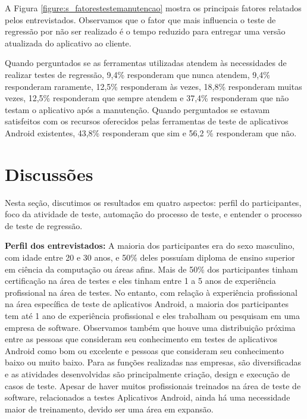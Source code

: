 \begin{enumerate}[label=\bf QP\arabic*]
A Figura \ref{figure:s_fatorestestemanutencao} mostra os principais fatores relatados pelos entrevistados. Observamos que o fator que mais influencia o teste de regressão por não ser realizado é o tempo reduzido para entregar uma versão atualizada do aplicativo ao cliente.

Quando perguntados se as ferramentas utilizadas atendem às necessidades de realizar testes de regressão, 9,4\% responderam que nunca atendem, 9,4\% responderam raramente, 12,5\% responderam às vezes, 18,8\% responderam muitas vezes, 12,5\% responderam que sempre atendem e 37,4\% responderam que não testam o aplicativo após a manutenção. Quando perguntados se estavam satisfeitos com os recursos oferecidos pelas ferramentas de teste de aplicativos Android existentes, 43,8\% responderam que sim e 56,2 \% responderam que não.

\end{enumerate}

\section{Discussões}\label{discussions}

Nesta seção, discutimos os resultados em quatro aspectos: perfil do participantes, foco da atividade de teste, automação do processo de teste, e entender o processo de teste de regressão.

\textbf{Perfil dos entrevistados:} A maioria dos participantes era do sexo masculino, com idade entre 20 e 30 anos, e 50\% deles possuíam diploma de ensino superior em ciência da computação ou áreas afins. Mais de 50\% dos participantes tinham certificação na área de testes e eles tinham entre 1 a 5 anos de experiência profissional na área de testes. No entanto, com relação à experiência profissional na área específica de teste de aplicativos Android, a maioria dos participantes tem até 1 ano de experiência profissional e eles trabalham ou pesquisam em uma empresa de software. Observamos também que houve uma distribuição próxima entre as pessoas que
consideram seu conhecimento em testes de aplicativos Android como bom ou excelente e pessoas que consideram seu conhecimento baixo ou muito baixo. Para as funções realizadas nas empresas, são diversificadas e as atividades desenvolvidas são principalmente criação, design e execução de casos de teste. Apesar de haver muitos profissionais treinados na área de teste de software, relacionados a testes Aplicativos Android, ainda há uma necessidade maior de treinamento, devido ser uma área em expansão.
    
